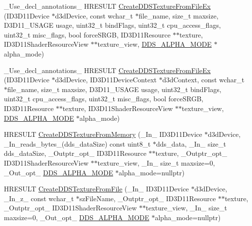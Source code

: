 \begin{DoxyCompactItemize}
\item 
\+\_\+\+Use\+\_\+decl\+\_\+annotations\+\_\+ H\+R\+E\+S\+U\+LT \hyperlink{namespacemage_a9a8f907c4cce316a587e7f35e78a255c}{Create\+D\+D\+S\+Texture\+From\+File\+Ex} (I\+D3\+D11\+Device $\ast$d3d\+Device, const wchar\+\_\+t $\ast$file\+\_\+name, size\+\_\+t maxsize, D3\+D11\+\_\+\+U\+S\+A\+GE usage, uint32\+\_\+t bind\+Flags, uint32\+\_\+t cpu\+\_\+access\+\_\+flags, uint32\+\_\+t misc\+\_\+flags, bool force\+S\+R\+GB, I\+D3\+D11\+Resource $\ast$$\ast$texture, I\+D3\+D11\+Shader\+Resource\+View $\ast$$\ast$texture\+\_\+view, \hyperlink{namespacemage_a0c586a2bad862f4858900ca121ca80c2}{D\+D\+S\+\_\+\+A\+L\+P\+H\+A\+\_\+\+M\+O\+DE} $\ast$alpha\+\_\+mode)
\item 
\+\_\+\+Use\+\_\+decl\+\_\+annotations\+\_\+ H\+R\+E\+S\+U\+LT \hyperlink{namespacemage_a8d07edf15d12fdc0f0af833ea4845161}{Create\+D\+D\+S\+Texture\+From\+File\+Ex} (I\+D3\+D11\+Device $\ast$d3d\+Device, I\+D3\+D11\+Device\+Context $\ast$d3d\+Context, const wchar\+\_\+t $\ast$file\+\_\+name, size\+\_\+t maxsize, D3\+D11\+\_\+\+U\+S\+A\+GE usage, uint32\+\_\+t bind\+Flags, uint32\+\_\+t cpu\+\_\+access\+\_\+flags, uint32\+\_\+t misc\+\_\+flags, bool force\+S\+R\+GB, I\+D3\+D11\+Resource $\ast$$\ast$texture, I\+D3\+D11\+Shader\+Resource\+View $\ast$$\ast$texture\+\_\+view, \hyperlink{namespacemage_a0c586a2bad862f4858900ca121ca80c2}{D\+D\+S\+\_\+\+A\+L\+P\+H\+A\+\_\+\+M\+O\+DE} $\ast$alpha\+\_\+mode)
\item 
H\+R\+E\+S\+U\+LT \hyperlink{namespacemage_a43328fca7f4b8d7a25b12bac29f503dd}{Create\+D\+D\+S\+Texture\+From\+Memory} (\+\_\+\+In\+\_\+ I\+D3\+D11\+Device $\ast$d3d\+Device, \+\_\+\+In\+\_\+reads\+\_\+bytes\+\_\+(dds\+\_\+data\+Size) const uint8\+\_\+t $\ast$dds\+\_\+data, \+\_\+\+In\+\_\+ size\+\_\+t dds\+\_\+data\+Size, \+\_\+\+Outptr\+\_\+opt\+\_\+ I\+D3\+D11\+Resource $\ast$$\ast$texture, \+\_\+\+Outptr\+\_\+opt\+\_\+ I\+D3\+D11\+Shader\+Resource\+View $\ast$$\ast$texture\+\_\+view, \+\_\+\+In\+\_\+ size\+\_\+t maxsize=0, \+\_\+\+Out\+\_\+opt\+\_\+ \hyperlink{namespacemage_a0c586a2bad862f4858900ca121ca80c2}{D\+D\+S\+\_\+\+A\+L\+P\+H\+A\+\_\+\+M\+O\+DE} $\ast$alpha\+\_\+mode=nullptr)
\item 
H\+R\+E\+S\+U\+LT \hyperlink{namespacemage_aa0bc631077bed07a8b8c27b500ded2d5}{Create\+D\+D\+S\+Texture\+From\+File} (\+\_\+\+In\+\_\+ I\+D3\+D11\+Device $\ast$d3d\+Device, \+\_\+\+In\+\_\+z\+\_\+ const wchar\+\_\+t $\ast$sz\+File\+Name, \+\_\+\+Outptr\+\_\+opt\+\_\+ I\+D3\+D11\+Resource $\ast$$\ast$texture, \+\_\+\+Outptr\+\_\+opt\+\_\+ I\+D3\+D11\+Shader\+Resource\+View $\ast$$\ast$texture\+\_\+view, \+\_\+\+In\+\_\+ size\+\_\+t maxsize=0, \+\_\+\+Out\+\_\+opt\+\_\+ \hyperlink{namespacemage_a0c586a2bad862f4858900ca121ca80c2}{D\+D\+S\+\_\+\+A\+L\+P\+H\+A\+\_\+\+M\+O\+DE} $\ast$alpha\+\_\+mode=nullptr)

\end{DoxyCompactItemize}

